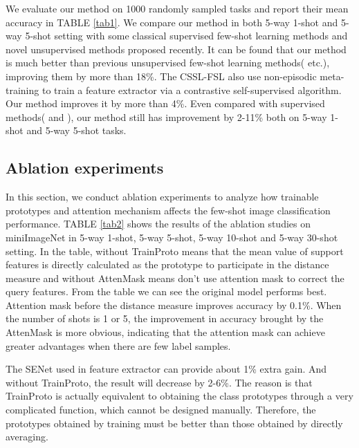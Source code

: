\documentclass[conference]{IEEEtran}
\begin{document}
We evaluate our method on 1000 randomly sampled tasks and report their mean accuracy in TABLE \ref{tab1}. We compare our method in both 5-way 1-shot and 5-way 5-shot setting with some classical supervised few-shot learning methods and novel unsupervised methods proposed recently. It can be found that our method is much better than previous unsupervised few-shot learning methods( \cite{ji2019unsupervised} etc.), improving them by more than 18\%.
The CSSL-FSL\cite{li2020few} also use non-episodic meta-training to train a feature extractor via a contrastive self-supervised algorithm. Our method improves it by more than 4\%. Even compared with supervised methods(\cite{finn2017model} and \cite{snell2017prototypical}), our method still has improvement by 2-11\% both on 5-way 1-shot and 5-way 5-shot tasks.

\subsection{Ablation experiments}
In this section, we conduct ablation experiments to analyze how trainable prototypes and attention mechanism affects the few-shot image classification performance. 
TABLE \ref{tab2} shows the results of the ablation studies on miniImageNet in 5-way 1-shot, 5-way 5-shot, 5-way 10-shot and 5-way 30-shot setting. In the table, without TrainProto means that the mean value of support features is directly calculated as the prototype to participate in the distance measure and without AttenMask means don't use attention mask to correct the query features. From the table we can see the original model performs best. Attention mask before the distance measure improves accuracy by 0.1\%. When the number of shots is 1 or 5, the improvement in accuracy brought by the AttenMask is more obvious, indicating that the attention mask can achieve greater advantages when there are few label samples.

The SENet used in feature extractor can provide about 1\% extra gain. And without TrainProto, the result will decrease by 2-6\%. The reason is that TrainProto is actually equivalent to obtaining the class prototypes through a very complicated function, which cannot be designed manually. Therefore, the prototypes obtained by training must be better than those obtained by directly averaging.
\end{document}
